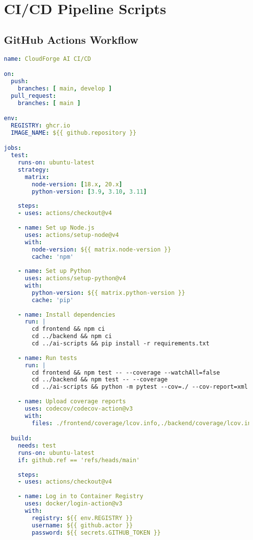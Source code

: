 \section{CI/CD Pipeline Scripts}

\subsection{GitHub Actions Workflow}

\begin{lstlisting}[language=yaml]
name: CloudForge AI CI/CD

on:
  push:
    branches: [ main, develop ]
  pull_request:
    branches: [ main ]

env:
  REGISTRY: ghcr.io
  IMAGE_NAME: ${{ github.repository }}

jobs:
  test:
    runs-on: ubuntu-latest
    strategy:
      matrix:
        node-version: [18.x, 20.x]
        python-version: [3.9, 3.10, 3.11]
    
    steps:
    - uses: actions/checkout@v4
    
    - name: Set up Node.js
      uses: actions/setup-node@v4
      with:
        node-version: ${{ matrix.node-version }}
        cache: 'npm'
    
    - name: Set up Python
      uses: actions/setup-python@v4
      with:
        python-version: ${{ matrix.python-version }}
        cache: 'pip'
    
    - name: Install dependencies
      run: |
        cd frontend && npm ci
        cd ../backend && npm ci
        cd ../ai-scripts && pip install -r requirements.txt
    
    - name: Run tests
      run: |
        cd frontend && npm test -- --coverage --watchAll=false
        cd ../backend && npm test -- --coverage
        cd ../ai-scripts && python -m pytest --cov=./ --cov-report=xml
    
    - name: Upload coverage reports
      uses: codecov/codecov-action@v3
      with:
        files: ./frontend/coverage/lcov.info,./backend/coverage/lcov.info,./ai-scripts/coverage.xml

  build:
    needs: test
    runs-on: ubuntu-latest
    if: github.ref == 'refs/heads/main'
    
    steps:
    - uses: actions/checkout@v4
    
    - name: Log in to Container Registry
      uses: docker/login-action@v3
      with:
        registry: ${{ env.REGISTRY }}
        username: ${{ github.actor }}
        password: ${{ secrets.GITHUB_TOKEN }}
    

\end{lstlisting}

